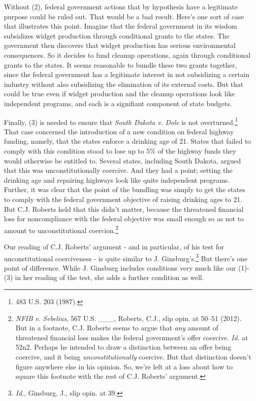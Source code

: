 Without (2), federal government actions that by hypothesis have a legitimate purpose could be ruled out. That would be a bad result. Here's one sort of case that illustrates this point. Imagine that the federal government in its wisdom subsidizes widget production through conditional grants to the states. The government then discovers that widget production has serious environmental consequences. So it decides to fund cleanup operations, again through conditional grants to the states. It seems reasonable to bundle these two grants together, since the federal government has a legitimate interest in not subsidizing a certain industry without also subsidizing the elimination of its external costs. But that could be true even if widget production and the cleanup operations look like independent programs, and each is a signifiant component of state budgets.

Finally, (3) is needed to ensure that \emph{South Dakota v. Dole} is not overturned.\footnote{483 U.S. 203 (1987).} That case concerned the introduction of a new condition on federal highway funding, namely, that the states enforce a drinking age of 21. States that failed to comply with this condition stood to lose up to 5\% of the highway funds they would otherwise be entitled to. Several states, including South Dakota, argued that this was unconstitutionally coercive. And they had a point; setting the drinking age and repairing highways look like quite independent programs. Further, it was clear that the point of the bundling was simply to get the states to comply with the federal government objective of raising drinking ages to 21. But C.J. Roberts held that this didn't matter, because the threatened financial loss for noncompliance with the federal objective was small enough so as not to amount to unconstitutional coercion.\footnote{\emph{NFIB v. Sebelius}, 567 U.S. \_\_\_, Roberts, C.J., slip opin. at 50--51 (2012). But in a footnote, C.J. Roberts seems to argue that \emph{any} amount of threatened financial loss makes the federal government's offer coercive. \emph{Id. }at 52n2. Perhaps he intended to draw a distinction between an offer being coercive, and it being \emph{unconstitutionally }coercive. But that distinction doesn't figure anywhere else in his opinion. So, we're left at a loss about how to square this footnote with the rest of C.J. Roberts' argument.}

Our reading of C.J. Roberts' argument - and in particular, of his test for unconstitutional coerciveness - is quite similar to J. Ginsburg's.\footnote{\emph{Id.}, Ginsburg, J., slip opin. at 39.} But there's one point of difference. While J. Ginsburg includes conditions very much like our (1)-(3) in her reading of the test, she adds a further condition as well.

